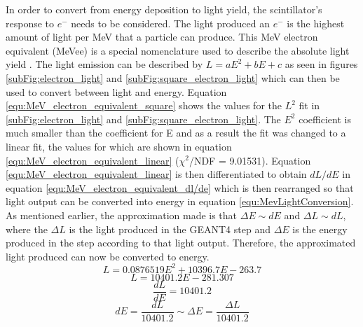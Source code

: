 In order to convert from energy deposition to light yield, the scintillator's response to $e^-$ needs to be considered. The light produced  an $e^-$ is the highest amount of light per MeV that a particle can produce. This MeV electron equivalent (MeVee) is a special nomenclature used to describe the absolute light yield \cite{knoll_2010}. The light emission can be described by $L = aE^2 + bE +c$ as seen in figures \ref{subFig:electron_light} and \ref{subFig:square_electron_light} which can then be used to convert between light and energy. Equation \ref{equ:MeV_electron_equivalent_square} shows the values for the $L^2$ fit in \ref{subFig:electron_light} and \ref{subFig:square_electron_light}. The $E^2$ coefficient is much smaller than the coefficient for E and as a result the fit was changed to a linear fit, the values for which are shown in equation \ref{equ:MeV_electron_equivalent_linear} ($\chi^2$/NDF = 9.01531). Equation \ref{equ:MeV_electron_equivalent_linear} is then differentiated to obtain $dL/dE$ in equation \ref{equ:MeV_electron_equivalent_dl/de} which is then rearranged so that light output can be converted into energy in equation \ref{equ:MevLightConversion}. As mentioned earlier, the approximation made is that $\Delta E \sim dE$ and $\Delta L \sim dL$, where the $\Delta L$ is the light produced in the GEANT4 step and $\Delta E$ is the energy produced in the step according to that light output. Therefore, the approximated light produced can now be converted to energy.
\begin{equation}
L = 0.0876519E^2 + 10396.7E - 263.7
\label{equ:MeV_electron_equivalent_square}
\end{equation}
\begin{equation}
L = 10401.2E - 281.307
\label{equ:MeV_electron_equivalent_linear}
\end{equation}
\begin{equation}
\frac{dL}{dE} = 10401.2
\label{equ:MeV_electron_equivalent_dl/de}
\end{equation}
\begin{equation}
dE = \frac{dL}{10401.2} \sim \Delta E = \frac{\Delta L}{10401.2}
\label{equ:MevLightConversion}
\end{equation}

